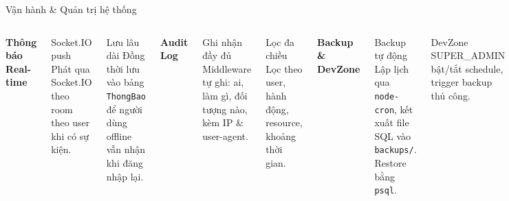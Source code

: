 \documentclass[aspectratio=43,xcolor=table]{beamer}
\begin{document}
\begin{frame}{Vận hành \& Quản trị hệ thống}
  \begin{columns}[T,onlytextwidth]
    \textbf{\textcolor{hustred}{Thông báo Real-time}}
    \begin{block}{Socket.IO push}
      \scriptsize Phát qua Socket.IO theo room theo user khi có sự kiện.
    \end{block}
    \begin{block}{Lưu lâu dài}
      \scriptsize Đồng thời lưu vào bảng \texttt{ThongBao} để người dùng offline vẫn nhận khi đăng nhập lại.
    \end{block}

    \textbf{\textcolor{hustred}{Audit Log}}
    \begin{block}{Ghi nhận đầy đủ}
      \scriptsize Middleware tự ghi: ai, làm gì, đối tượng nào, kèm IP \& user-agent.
    \end{block}
    \begin{block}{Lọc đa chiều}
      \scriptsize Lọc theo user, hành động, resource, khoảng thời gian.
    \end{block}

    \textbf{\textcolor{hustred}{Backup \& DevZone}}
    \begin{block}{Backup tự động}
      \scriptsize Lập lịch qua \texttt{node-cron}, kết xuất file SQL vào \texttt{backups/}. Restore bằng \texttt{psql}.
    \end{block}
    \begin{block}{DevZone}
      \scriptsize SUPER\_ADMIN bật/tắt schedule, trigger backup thủ công.
    \end{block}
  \end{columns}
\end{frame}
\end{document}
